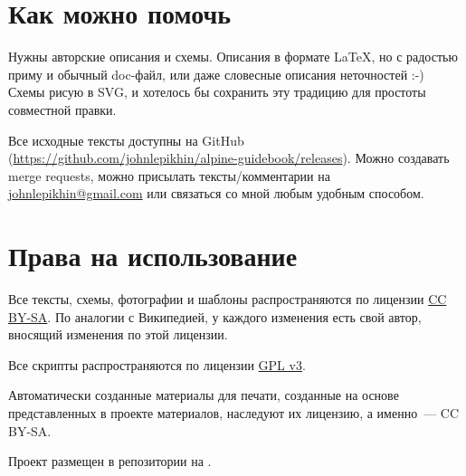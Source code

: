 \documentclass[11pt,fleqn]{report} %
\begin{document}
\section{Как можно помочь}

Нужны авторские описания и схемы. Описания в формате \LaTeX, но с
радостью приму и обычный doc-файл, или даже словесные описания
неточностей :-) Схемы рисую в SVG, и хотелось бы сохранить эту
традицию для простоты совместной правки.

Все исходные тексты доступны на GitHub
(\href{https://github.com/johnlepikhin/alpine-guidebook}{https://github.com/johnlepikhin/alpine-guidebook/releases}). Можно создавать merge
requests, можно присылать тексты/комментарии на \href{mailto:johnlepikhin@gmail.com}{johnlepikhin@gmail.com} или связаться со мной любым
удобным способом.

\section{Права на использование}

Все тексты, схемы, фотографии и шаблоны распространяются по лицензии
\href{https://creativecommons.org/licenses/by-sa/4.0/legalcode.ru}{CC
  BY-SA}. По аналогии с Википедией, у каждого изменения есть свой
автор, вносящий изменения по этой лицензии.

Все скрипты распространяются по лицензии
\href{https://www.gnu.org/licenses/quick-guide-gplv3.ru.html}{GPL v3}.

Автоматически созданные материалы для печати, созданные на основе
представленных в проекте материалов, наследуют их лицензию, а
именно~--- CC BY-SA.

Проект размещен в репозитории на \gitRepo.

\clearpage

\printglossary[title={Термины}]
\end{document}
